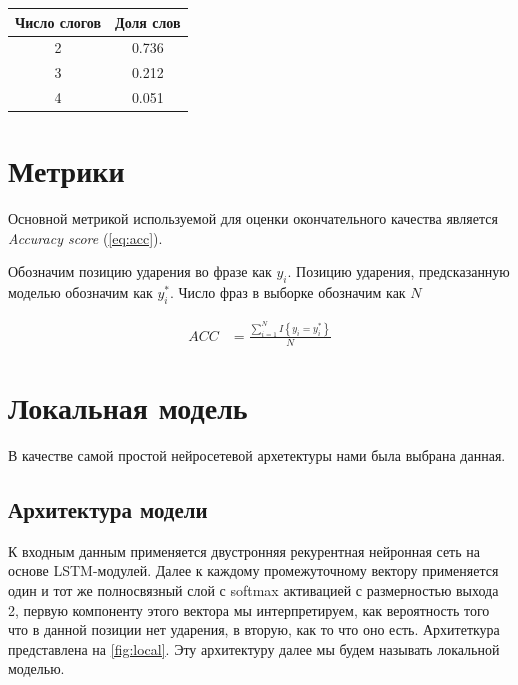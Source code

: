 \documentclass[14pt, a4paper, russian]{report}
\begin{document}
\begin{normalsize}
\begin{table}[H]
	\begin{small}
		\begin{center}
			\begin{tabular}{|c|c|}
				\hline
				Число слогов & Доля слов \\ \hline
				     2       &   0.736   \\ \hline
				     3       &   0.212   \\ \hline
				     4       &   0.051   \\ \hline
			\end{tabular}
		\end{center}
	\end{small}
	\label{table:length_homo}
\end{table}	



\section{Метрики}
Основной метрикой используемой для оценки окончательного качества является \textit{Accuracy score}  (\ref{eq:acc}). 

Обозначим позицию ударения во фразе как $y_i$. Позицию ударения, предсказанную моделью обозначим как $y^*_i$. Число фраз в выборке обозначим как $N$

\begin{align}
\label{eq:acc} ACC &= \frac{\sum\limits_{i=1}^{N}I \left\{y_i = y^*_i\right\}}{N} 
\end{align}

\section{Локальная модель}
В качестве самой простой нейросетевой архетектуры нами была выбрана данная. 
\subsection{Архитектура модели}
К входным данным применяется двустронняя рекурентная нейронная сеть на основе LSTM-модулей. Далее к каждому промежуточному вектору применяется один и тот же полносвязный слой с softmax активацией с размерностью выхода 2, первую компоненту этого вектора мы интерпретируем, как вероятность того что в данной позиции нет ударения, в вторую, как то что оно есть. Архитеткура представлена на \cref{fig:local}. Эту архитектуру далее мы будем называть локальной моделью. 


\end{normalsize}
\end{document}
